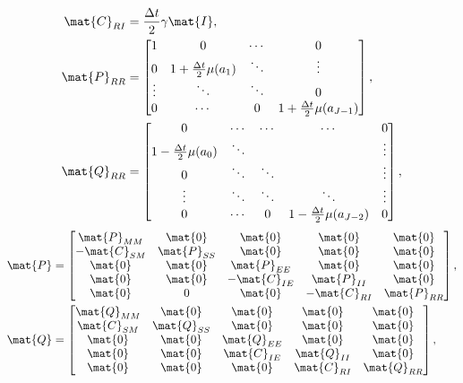 \documentclass{jpmarticle}
\begin{document}
\begin{equation}
  \begin{split}
    \mat{C}_{RI} &=
    \frac{\Delta t}{2} \gamma \mat{I},
    \\
    \mat{P}_{RR} &=
    \begin{bmatrix}
      1 & 0 & \cdots & 0
      \\
      0 & 1 + \frac{\Delta t}{2} \mu(a_1) &
      \ddots & \vdots
      \\
      \vdots & \ddots & \ddots & 0
      \\
      0 & \cdots & 0 &
      1 + \frac{\Delta t}{2} \mu(a_{J - 1})
    \end{bmatrix},
    \\
    \mat{Q}_{RR} &=
    \begin{bmatrix}
      0 & \cdots & \cdots & \cdots & 0
      \\
      1 - \frac{\Delta t}{2} \mu(a_0) & \ddots &
      & & \vdots
      \\
      0 & \ddots & \ddots & & \vdots
      \\
      \vdots & \ddots & \ddots & \ddots & \vdots
      \\
      0 & \cdots & 0 &
      1 - \frac{\Delta t}{2} \mu(a_{J - 2}) & 0
    \end{bmatrix},
  \end{split}
\end{equation}
\begin{equation}
  \begin{split}
    \mat{P} &=
    \begin{bmatrix}
      \mat{P}_{MM} & \mat{0} & \mat{0} & \mat{0} & \mat{0}
      \\
      - \mat{C}_{SM} & \mat{P}_{SS} & \mat{0} & \mat{0} & \mat{0}
      \\
      \mat{0} & \mat{0} & \mat{P}_{EE} & \mat{0} & \mat{0}
      \\
      \mat{0} & \mat{0} & - \mat{C}_{IE} & \mat{P}_{II} & \mat{0}
      \\
      \mat{0} & 0 & \mat{0} & - \mat{C}_{RI} & \mat{P}_{RR}
    \end{bmatrix},
    \\
    \mat{Q} &=
    \begin{bmatrix}
      \mat{Q}_{MM} & \mat{0} & \mat{0} & \mat{0} & \mat{0}
      \\
      \mat{C}_{SM} & \mat{Q}_{SS} & \mat{0} & \mat{0} & \mat{0}
      \\
      \mat{0} & \mat{0} & \mat{Q}_{EE} & \mat{0} & \mat{0}
      \\
      \mat{0} & \mat{0} & \mat{C}_{IE} & \mat{Q}_{II} & \mat{0}
      \\
      \mat{0} & \mat{0} & \mat{0} & \mat{C}_{RI} & \mat{Q}_{RR}
    \end{bmatrix},
  \end{split}
\end{equation}
\end{document}
